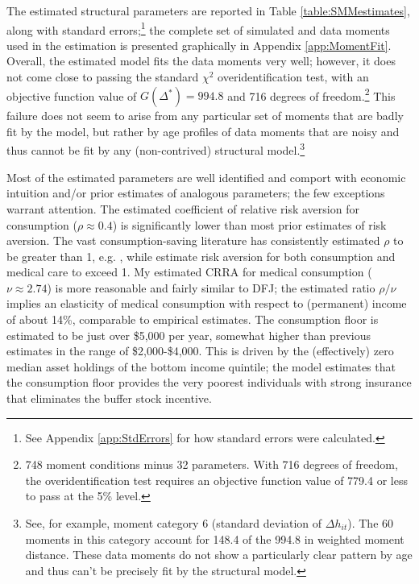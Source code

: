 \documentclass[12pt,pdftex,letterpaper]{article}
\newcommand{\Health}{h}
\newcommand{\CRRAcon}{\rho}
\newcommand{\CRRAcare}{\nu}
\begin{document}
The estimated structural parameters are reported in Table \ref{table:SMMestimates}, along with standard errors;\footnote{See Appendix \ref{app:StdErrors} for how standard errors were calculated.} the complete set of simulated and data moments used in the estimation is presented graphically in Appendix \ref{app:MomentFit}.  Overall, the estimated model fits the data moments very well; however, it does not come close to passing the standard $\chi^2$ overidentification test, with an objective function value of $G(\Delta^*) = 994.8$ and 716 degrees of freedom.\footnote{748 moment conditions minus 32 parameters.  With 716 degrees of freedom, the overidentification test requires an objective function value of 779.4 or less to pass at the 5\% level.}  This failure does not seem to arise from any particular set of moments that are badly fit by the model, but rather by age profiles of data moments that are noisy and thus cannot be fit by any (non-contrived) structural model.\footnote{See, for example, moment category 6 (standard deviation of $\Delta \Health_{it}$).  The 60 moments in this category account for 148.4 of the 994.8 in weighted moment distance. These data moments do not show a particularly clear pattern by age and thus can't be precisely fit by the structural model.}

Most of the estimated parameters are well identified and comport with economic intuition and/or prior estimates of analogous parameters; the few exceptions warrant attention.  The estimated coefficient of relative risk aversion for consumption ($\CRRAcon \approx 0.4$) is significantly lower than most prior estimates of risk aversion.  The vast consumption-saving literature has consistently estimated $\CRRAcon$ to be greater than 1, e.g. \cite{cagetti03}, while \cite{dinardi10} estimate risk aversion for both consumption and medical care to exceed 1.  My estimated CRRA for medical consumption ($\CRRAcare \approx 2.74$) is more reasonable and fairly similar to DFJ; the estimated ratio $\CRRAcon/\CRRAcare$ implies an elasticity of medical consumption with respect to (permanent) income of about 14\%, comparable to empirical estimates.  The consumption floor is estimated to be just over \$5,000 per year, somewhat higher than previous estimates in the range of \$2,000-\$4,000.  This is driven by the (effectively) zero median asset holdings of the bottom income quintile; the model estimates that the consumption floor provides the very poorest individuals with strong insurance that eliminates the buffer stock incentive.
\end{document}
